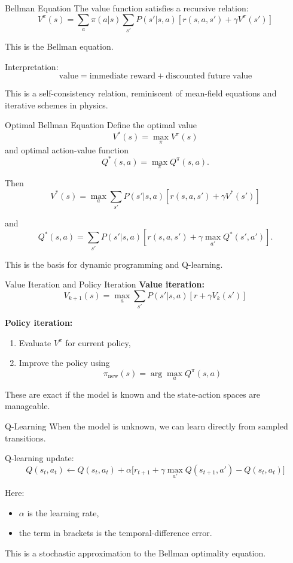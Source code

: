 \documentclass[aspectratio=169]{beamer}
\begin{document}
\begin{frame}{Bellman Equation}
  The value function satisfies a recursive relation:
  \[
  V^\pi(s)=\sum_a \pi(a|s)\sum_{s'} P(s'|s,a)
  \left[r(s,a,s')+\gamma V^\pi(s')\right]
  \]

  This is the Bellman equation.

  Interpretation:
  \[
  \text{value} = \text{immediate reward} + \text{discounted future value}
  \]

  This is a self-consistency relation, reminiscent of mean-field equations and iterative schemes in physics.
\end{frame}

\begin{frame}{Optimal Bellman Equation}
  Define the optimal value
  \[
  V^*(s)=\max_\pi V^\pi(s)
  \]
  and optimal action-value function
  \[
  Q^*(s,a)=\max_\pi Q^\pi(s,a).
  \]

  Then
  \[
  V^*(s)=\max_a \sum_{s'} P(s'|s,a)
  \left[r(s,a,s')+\gamma V^*(s')\right]
  \]

  and
  \[
  Q^*(s,a)=\sum_{s'} P(s'|s,a)
  \left[r(s,a,s')+\gamma \max_{a'}Q^*(s',a')\right].
  \]

  This is the basis for dynamic programming and Q-learning.
\end{frame}

\begin{frame}{Value Iteration and Policy Iteration}
  \textbf{Value iteration:}
  \[
  V_{k+1}(s)=\max_a \sum_{s'} P(s'|s,a)\left[r+\gamma V_k(s')\right]
  \]

  \textbf{Policy iteration:}
  \begin{enumerate}
  \item Evaluate $V^\pi$ for current policy,
  \item Improve the policy using
    \[
    \pi_{\text{new}}(s)=\arg\max_a Q^\pi(s,a)
    \]
  \end{enumerate}

  These are exact if the model is known and the state-action spaces are manageable.
\end{frame}

\begin{frame}{Q-Learning}
  When the model is unknown, we can learn directly from sampled transitions.

  Q-learning update:
  \[
  Q(s_t,a_t)\leftarrow Q(s_t,a_t) +
  \alpha\Big[r_{t+1}+\gamma \max_{a'}Q(s_{t+1},a')-Q(s_t,a_t)\Big]
  \]

  Here:
  \begin{itemize}
  \item $\alpha$ is the learning rate,
  \item the term in brackets is the temporal-difference error.
  \end{itemize}

  This is a stochastic approximation to the Bellman optimality equation.
\end{frame}
\end{document}
